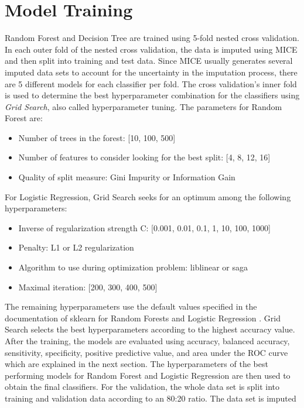 \section{Model Training}
Random Forest and Decision Tree are trained using 5-fold nested cross 
validation.
In each outer fold of the nested cross validation, the data is imputed using 
MICE and then split into training and test data. Since MICE usually generates 
several imputed data sets to account for the uncertainty in the imputation 
process, there are 5 different models for each classifier per fold. The cross 
validation's inner fold is used to determine the best hyperparameter 
combination for the classifiers using \textit{Grid Search}, also called 
hyperparameter tuning. The parameters for Random Forest are:
\begin{itemize}
 \item Number of trees in the forest: [10, 100, 500]
 \item Number of features to consider looking for the best split: [4, 8, 12, 16]
 \item Quality of split measure: Gini Impurity or Information Gain
\end{itemize}
For Logistic Regression, Grid Search seeks for an optimum among the 
following hyperparameters:
\begin{itemize}
 \item Inverse of regularization strength C: [0.001, 0.01, 0.1, 1, 10, 100, 
1000]
 \item Penalty: L1 or L2 regularization
 \item Algorithm to use during optimization problem: liblinear or saga
 \item Maximal iteration: [200, 300, 400, 500]
\end{itemize}
The remaining hyperparameters use the default values specified in the 
documentation of sklearn for Random Forests and Logistic Regression 
\cite{RN191}.
Grid Search selects the best hyperparameters according to the highest accuracy 
value.
\\
After the training, the models are evaluated using accuracy, balanced 
accuracy, sensitivity, 
specificity, positive predictive value, and area under the ROC curve which are 
explained in the next section.
The hyperparameters of the best performing models for Random Forest and 
Logistic Regression are then used to obtain the final classifiers.
For the validation, the whole data set is split into training and validation 
data according to an 80:20 ratio. The data set is imputed 

